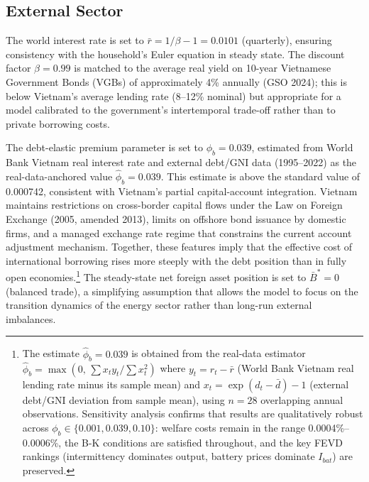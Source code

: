 \documentclass[12pt, a4paper]{article}
\begin{document}
\subsection{External Sector}

The world interest rate is set to $\bar{r} = 1/\beta - 1 = 0.0101$ (quarterly), ensuring consistency with the household's Euler equation in steady state. The discount factor $\beta = 0.99$ is matched to the average real yield on 10-year Vietnamese Government Bonds (VGBs) of approximately 4\% annually (GSO 2024); this is below Vietnam's average lending rate (8--12\% nominal) but appropriate for a model calibrated to the government's intertemporal trade-off rather than to private borrowing costs.

The debt-elastic premium parameter is set to $\phi_b = 0.039$, estimated from World Bank Vietnam real interest rate and external debt/GNI data (1995--2022) as the real-data-anchored value $\hat{\phi}_b = 0.039$. This estimate is above the standard \citet{schmittgrohe2003} value of 0.000742, consistent with Vietnam's partial capital-account integration. Vietnam maintains restrictions on cross-border capital flows under the Law on Foreign Exchange (2005, amended 2013), limits on offshore bond issuance by domestic firms, and a managed exchange rate regime that constrains the current account adjustment mechanism. Together, these features imply that the effective cost of international borrowing rises more steeply with the debt position than in fully open economies.\footnote{The estimate $\hat{\phi}_b = 0.039$ is obtained from the real-data estimator $\hat{\phi}_b = \max\!\left(0,\, \sum x_t y_t / \sum x_t^2\right)$ where $y_t = r_t - \bar{r}$ (World Bank Vietnam real lending rate minus its sample mean) and $x_t = \exp(d_t - \bar{d})-1$ (external debt/GNI deviation from sample mean), using $n=28$ overlapping annual observations. Sensitivity analysis confirms that results are qualitatively robust across $\phi_b \in \{0.001, 0.039, 0.10\}$: welfare costs remain in the range 0.0004\%--0.0006\%, the B-K conditions are satisfied throughout, and the key FEVD rankings (intermittency dominates output, battery prices dominate $I_{bat}$) are preserved.} The steady-state net foreign asset position is set to $\bar{B}^* = 0$ (balanced trade), a simplifying assumption that allows the model to focus on the transition dynamics of the energy sector rather than long-run external imbalances.
\end{document}
